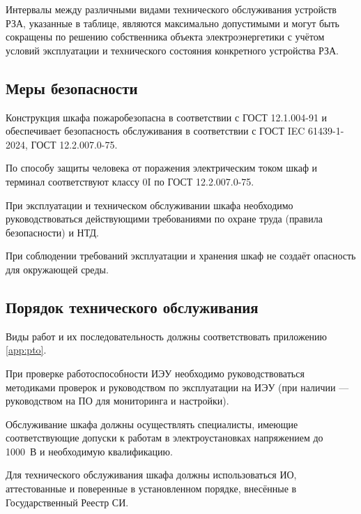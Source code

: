 \begin{enumsub}
\item Интервалы между различными видами технического обслуживания устройств РЗА, указанные в таблице, являются максимально допустимыми и могут быть сокращены по решению собственника объекта электроэнергетики с учётом условий эксплуатации и технического состояния конкретного устройства РЗА.
\end{enumsub}

{\color{unimain}\subsection{Меры безопасности}}

\begin{enumsub}
\item Конструкция шкафа пожаробезопасна в соответствии с ГОСТ 12.1.004-91 и обеспечивает безопасность обслуживания в соответствии с ГОСТ IEC 61439-1-2024, ГОСТ 12.2.007.0-75.
\item По способу защиты человека от поражения электрическим током шкаф и терминал соответствуют классу 0I по ГОСТ 12.2.007.0-75.
\item При эксплуатации и техническом обслуживании шкафа необходимо руководствоваться действующими требованиями по охране труда (правила безопасности) и НТД.
\item При соблюдении требований эксплуатации и хранения шкаф не создаёт опасность для окружающей среды.
\end{enumsub}

{\color{unimain}\subsection{Порядок технического обслуживания}}

\begin{enumsub}
\item Виды работ и их последовательность должны соответствовать приложению \ref{app:pto}.
\item При проверке работоспособности ИЭУ необходимо руководствоваться методиками проверок и руководством по эксплуатации на ИЭУ (при наличии — руководством на ПО для мониторинга и настройки).
\item Обслуживание шкафа должны осуществлять специалисты, имеющие соответствующие допуски к работам в электроустановках напряжением до 1000~В и необходимую квалификацию.
\item Для технического обслуживания шкафа должны использоваться ИО, аттестованные и поверенные в установленном порядке, внесённые в Государственный Реестр СИ.
\end{enumsub}